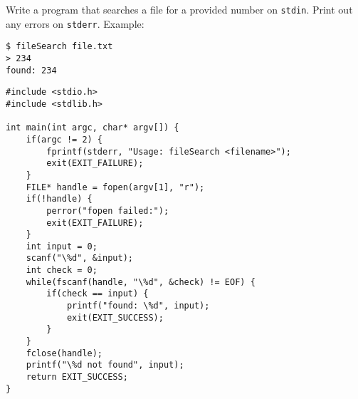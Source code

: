 Write a program that searches a file for a provided number on \texttt{stdin}.
Print out any errors on \texttt{stderr}.
Example:

\begin{lstlisting}[numbers=none]
$ fileSearch file.txt
> 234
found: 234
\end{lstlisting}

\begin{answer}
\begin{lstlisting}
#include <stdio.h>
#include <stdlib.h>

int main(int argc, char* argv[]) {
	if(argc != 2) {
		fprintf(stderr, "Usage: fileSearch <filename>");
		exit(EXIT_FAILURE);
	}
	FILE* handle = fopen(argv[1], "r");
	if(!handle) {
		perror("fopen failed:");
		exit(EXIT_FAILURE);
	}
	int input = 0;
	scanf("\%d", &input);
	int check = 0;
	while(fscanf(handle, "\%d", &check) != EOF) {
		if(check == input) {
			printf("found: \%d", input);
			exit(EXIT_SUCCESS);
		}
	}
	fclose(handle);
	printf("\%d not found", input);
	return EXIT_SUCCESS;
}
\end{lstlisting}
\end{answer}
